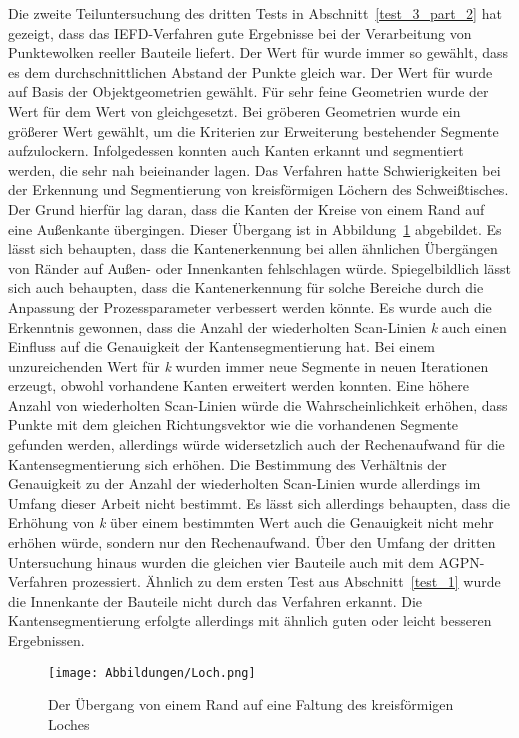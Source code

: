 Die zweite Teiluntersuchung des dritten Tests in Abschnitt~\ref{test_3_part_2} hat gezeigt, dass das IEFD-Verfahren gute Ergebnisse bei der Verarbeitung von Punktewolken reeller Bauteile liefert. Der Wert für \distthresha wurde immer so gewählt, dass es dem durchschnittlichen Abstand der Punkte gleich war. Der Wert für \distthreshb wurde auf Basis der Objektgeometrien gewählt. Für sehr feine Geometrien wurde der Wert für \distthreshb dem Wert von \distthresha gleichgesetzt. Bei gröberen Geometrien wurde ein größerer Wert gewählt, um die Kriterien zur Erweiterung bestehender Segmente aufzulockern. Infolgedessen konnten auch Kanten erkannt und segmentiert werden, die sehr nah beieinander lagen. Das Verfahren hatte Schwierigkeiten bei der Erkennung und Segmentierung von kreisförmigen Löchern des Schweißtisches. Der Grund hierfür lag daran, dass die Kanten der Kreise von einem Rand auf eine Außenkante übergingen. Dieser Übergang ist in Abbildung~\ref{fig: Loch} abgebildet. Es lässt sich behaupten, dass die Kantenerkennung bei allen ähnlichen Übergängen von Ränder auf Außen- oder Innenkanten fehlschlagen würde. Spiegelbildlich lässt sich auch behaupten, dass die Kantenerkennung für solche Bereiche durch die Anpassung der Prozessparameter verbessert werden könnte. Es wurde auch die Erkenntnis gewonnen, dass die Anzahl der wiederholten Scan-Linien \textit{k} auch einen Einfluss auf die Genauigkeit der Kantensegmentierung hat. Bei einem unzureichenden Wert für \textit{k} wurden immer neue Segmente in neuen Iterationen erzeugt, obwohl vorhandene Kanten erweitert werden konnten. Eine höhere Anzahl von wiederholten Scan-Linien würde die Wahrscheinlichkeit erhöhen, dass Punkte mit dem gleichen Richtungsvektor wie die vorhandenen Segmente gefunden werden, allerdings würde widersetzlich auch der Rechenaufwand für die Kantensegmentierung sich erhöhen. Die Bestimmung des Verhältnis der Genauigkeit zu der Anzahl der wiederholten Scan-Linien wurde allerdings im Umfang dieser Arbeit nicht bestimmt. Es lässt sich allerdings behaupten, dass die Erhöhung von \textit{k} über einem bestimmten Wert auch die Genauigkeit nicht mehr erhöhen würde, sondern nur den Rechenaufwand. Über den Umfang der dritten Untersuchung hinaus wurden die gleichen vier Bauteile auch mit dem AGPN-Verfahren prozessiert. Ähnlich zu dem ersten Test aus Abschnitt~\ref{test_1} wurde die Innenkante der Bauteile nicht durch das Verfahren erkannt. Die Kantensegmentierung erfolgte allerdings mit ähnlich guten oder leicht besseren Ergebnissen. 

\begin{figure}[t]
	\texttt{[image: Abbildungen/Loch.png]}
	\centering
	\caption[Übergangsregion zweier Kanten]{Der Übergang von einem Rand auf eine Faltung des kreisförmigen Loches}
	\label{fig: Loch}
\end{figure}

